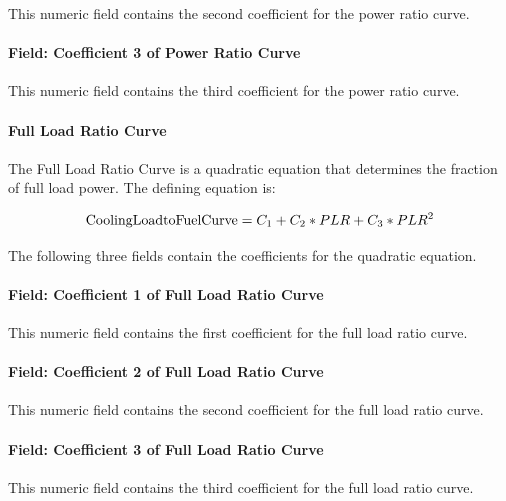 This numeric field contains the second coefficient for the power ratio curve.

\paragraph{Field: Coefficient 3 of Power Ratio Curve}\label{field-coefficient-3-of-power-ratio-curve-1}

This numeric field contains the third coefficient for the power ratio curve.

\paragraph{Full Load Ratio Curve}\label{full-load-ratio-curve-1}

The Full Load Ratio Curve is a quadratic equation that determines the fraction of full load power. The defining equation is:

\begin{equation}
{\rm{CoolingLoadtoFuelCurve}}
    = {C_1} + {C_2} * PLR + {C_3} * PL{R^2}
\end{equation}

The following three fields contain the coefficients for the quadratic equation.

\paragraph{Field: Coefficient 1 of Full Load Ratio Curve}\label{field-coefficient-1-of-full-load-ratio-curve-1}

This numeric field contains the first coefficient for the full load ratio curve.

\paragraph{Field: Coefficient 2 of Full Load Ratio Curve}\label{field-coefficient-2-of-full-load-ratio-curve-1}

This numeric field contains the second coefficient for the full load ratio curve.

\paragraph{Field: Coefficient 3 of Full Load Ratio Curve}\label{field-coefficient-3-of-full-load-ratio-curve-1}

This numeric field contains the third coefficient for the full load ratio curve.

